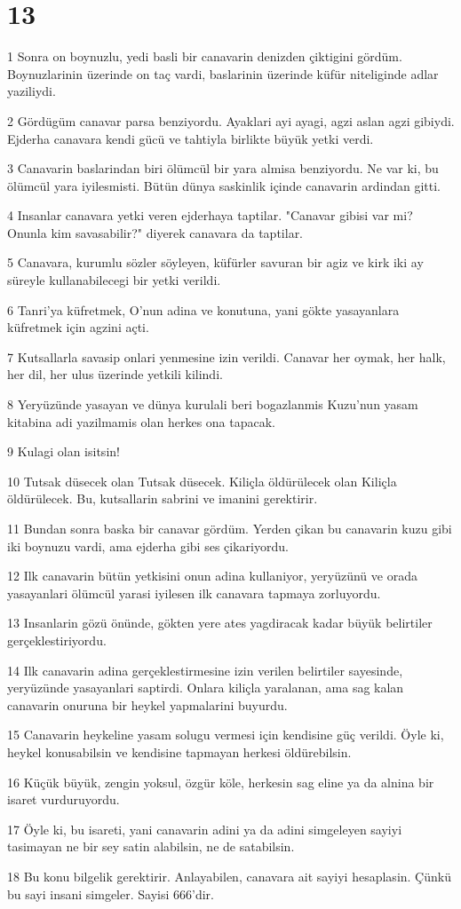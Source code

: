 \chapter{13}

\par 1 Sonra on boynuzlu, yedi basli bir canavarin denizden çiktigini gördüm. Boynuzlarinin üzerinde on taç vardi, baslarinin üzerinde küfür niteliginde adlar yaziliydi.
\par 2 Gördügüm canavar parsa benziyordu. Ayaklari ayi ayagi, agzi aslan agzi gibiydi. Ejderha canavara kendi gücü ve tahtiyla birlikte büyük yetki verdi.
\par 3 Canavarin baslarindan biri ölümcül bir yara almisa benziyordu. Ne var ki, bu ölümcül yara iyilesmisti. Bütün dünya saskinlik içinde canavarin ardindan gitti.
\par 4 Insanlar canavara yetki veren ejderhaya taptilar. "Canavar gibisi var mi? Onunla kim savasabilir?" diyerek canavara da taptilar.
\par 5 Canavara, kurumlu sözler söyleyen, küfürler savuran bir agiz ve kirk iki ay süreyle kullanabilecegi bir yetki verildi.
\par 6 Tanri'ya küfretmek, O'nun adina ve konutuna, yani gökte yasayanlara küfretmek için agzini açti.
\par 7 Kutsallarla savasip onlari yenmesine izin verildi. Canavar her oymak, her halk, her dil, her ulus üzerinde yetkili kilindi.
\par 8 Yeryüzünde yasayan ve dünya kurulali beri bogazlanmis Kuzu'nun yasam kitabina adi yazilmamis olan herkes ona tapacak.
\par 9 Kulagi olan isitsin!
\par 10 Tutsak düsecek olan Tutsak düsecek. Kiliçla öldürülecek olan Kiliçla öldürülecek. Bu, kutsallarin sabrini ve imanini gerektirir.
\par 11 Bundan sonra baska bir canavar gördüm. Yerden çikan bu canavarin kuzu gibi iki boynuzu vardi, ama ejderha gibi ses çikariyordu.
\par 12 Ilk canavarin bütün yetkisini onun adina kullaniyor, yeryüzünü ve orada yasayanlari ölümcül yarasi iyilesen ilk canavara tapmaya zorluyordu.
\par 13 Insanlarin gözü önünde, gökten yere ates yagdiracak kadar büyük belirtiler gerçeklestiriyordu.
\par 14 Ilk canavarin adina gerçeklestirmesine izin verilen belirtiler sayesinde, yeryüzünde yasayanlari saptirdi. Onlara kiliçla yaralanan, ama sag kalan canavarin onuruna bir heykel yapmalarini buyurdu.
\par 15 Canavarin heykeline yasam solugu vermesi için kendisine güç verildi. Öyle ki, heykel konusabilsin ve kendisine tapmayan herkesi öldürebilsin.
\par 16 Küçük büyük, zengin yoksul, özgür köle, herkesin sag eline ya da alnina bir isaret vurduruyordu.
\par 17 Öyle ki, bu isareti, yani canavarin adini ya da adini simgeleyen sayiyi tasimayan ne bir sey satin alabilsin, ne de satabilsin.
\par 18 Bu konu bilgelik gerektirir. Anlayabilen, canavara ait sayiyi hesaplasin. Çünkü bu sayi insani simgeler. Sayisi 666'dir.

